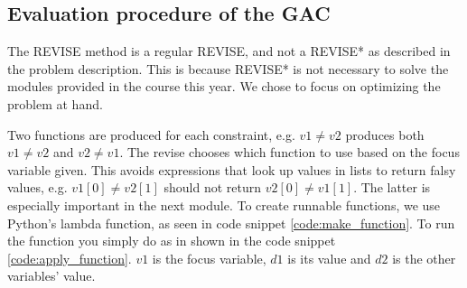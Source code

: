 

\subsection{Evaluation procedure of the GAC}
The REVISE method is a regular REVISE, and not a REVISE* as described in the problem description. This is because REVISE* is not necessary to solve the modules provided in the course this year. We chose to focus on optimizing the problem at hand.



Two functions are produced for each constraint, e.g. \( v1 \neq v2 \) produces both \(v1 \neq v2 \) and \(v2 \neq v1 \). The revise chooses which function to use based on the focus variable given. This avoids expressions that look up values in lists to return falsy values, e.g. \( v1[0] \neq v2[1] \) should not return \( v2[0] \neq v1[1] \). The latter is especially important in the next module. To create runnable functions, we use Python's lambda function, as seen in code snippet \ref{code:make_function}. To run the function you simply do as in shown in the code snippet \ref{code:apply_function}. \(v1\) is the focus variable, \(d1\) is its value and \(d2\) is the other variables' value.

